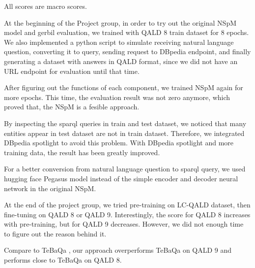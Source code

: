 All scores are macro scores. 

At the beginning of the Project group,
in order to try out the original NSpM model and gerbil evaluation,
we trained with QALD 8 train dataset for 8 epochs. 
We also implemented a python script to simulate 
receiving natural language question, 
converting it to query,
sending request to DBpedia endpoint, 
and finally generating a dataset with answers in QALD format,
since we did not have an URL endpoint for evaluation until that time. 

After figuring out the functions of each component, 
we trained NSpM again for more epochs. 
This time, the evaluation result was not zero anymore, 
which proved that,
the NSpM is a fesible approach. 

By inspecting the sparql queries in train and test dataset, 
we noticed that
many entities appear in test dataset are not in train dataset. 
Therefore, we integrated DBpedia spotlight to avoid this problem. 
With DBpedia spotlight and more training data, 
the result has been greatly improved. 

For a better conversion from natural language question to sparql query, 
we used hugging face Pegasus model instead of the simple encoder and decoder neural network in the original NSpM.

At the end of the project group, we tried pre-training on LC-QALD dataset, then fine-tuning on QALD 8 or QALD 9. 
Interestingly, the score for QALD 8 increases with pre-training, 
but for QALD 9 decreases. 
However, we did not enough time to figure out the reason behind it. 

Compare to TeBaQa \cite{DBLP:journals/corr/abs-2103-06752},
our approach overperforms TeBaQa on QALD 9 and performs close to TeBaQa on QALD 8.